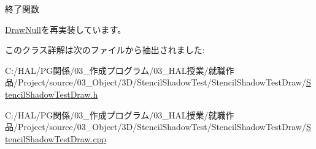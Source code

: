終了関数 



\mbox{\hyperlink{class_draw_null_a12d44e341c7364b5ab9cdd661dc16187}{Draw\+Null}}を再実装しています。



このクラス詳解は次のファイルから抽出されました\+:\begin{DoxyCompactItemize}
\item 
C\+:/\+H\+A\+L/\+P\+G関係/03\+\_\+作成プログラム/03\+\_\+\+H\+A\+L授業/就職作品/\+Project/source/03\+\_\+\+Object/3\+D/\+Stencil\+Shadow\+Test/\+Stencil\+Shadow\+Test\+Draw/\mbox{\hyperlink{_stencil_shadow_test_draw_8h}{Stencil\+Shadow\+Test\+Draw.\+h}}\item 
C\+:/\+H\+A\+L/\+P\+G関係/03\+\_\+作成プログラム/03\+\_\+\+H\+A\+L授業/就職作品/\+Project/source/03\+\_\+\+Object/3\+D/\+Stencil\+Shadow\+Test/\+Stencil\+Shadow\+Test\+Draw/\mbox{\hyperlink{_stencil_shadow_test_draw_8cpp}{Stencil\+Shadow\+Test\+Draw.\+cpp}}\end{DoxyCompactItemize}
